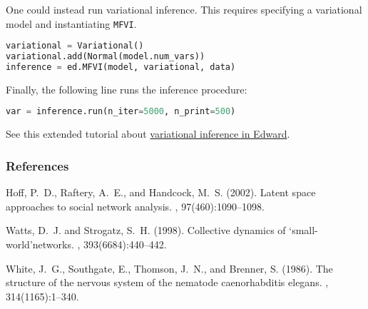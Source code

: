One could instead run variational inference. This requires specifying
a variational model and instantiating \texttt{MFVI}.
\begin{lstlisting}[language=Python]
variational = Variational()
variational.add(Normal(model.num_vars))
inference = ed.MFVI(model, variational, data)
\end{lstlisting}
Finally, the following line runs the inference procedure:
\begin{lstlisting}[language=Python]
var = inference.run(n_iter=5000, n_print=500)
\end{lstlisting}
See this extended tutorial about
\href{tut_KLqp.html}{variational inference in Edward}.

\subsubsection{References}

\begin{thebibliography}{}
Hoff, P.~D., Raftery, A.~E., and Handcock, M.~S. (2002).
\newblock Latent space approaches to social network analysis.
,
  97(460):1090--1098.

Watts, D.~J. and Strogatz, S.~H. (1998).
\newblock Collective dynamics of ‘small-world’networks.
, 393(6684):440--442.

White, J.~G., Southgate, E., Thomson, J.~N., and Brenner, S. (1986).
\newblock The structure of the nervous system of the nematode caenorhabditis
  elegans.
, 314(1165):1--340.
\end{thebibliography}
